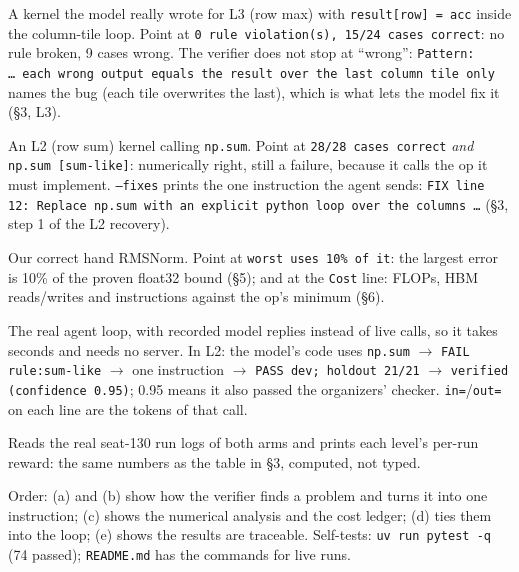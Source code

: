 \documentclass[11pt]{article}
\newcommand{\code}[1]{\texttt{#1}}
\begin{document}
\begin{description}[leftmargin=0pt,itemsep=3pt]
\item[(a) The verifier names the cause.] A kernel the model really wrote for L3 (row max) with
  \code{result[row] = acc} inside the column-tile loop. Point at \code{0 rule violation(s), 15/24 cases
  correct}: no rule broken, 9 cases wrong. The verifier does not stop at ``wrong'': \code{Pattern: \dots\
  each wrong output equals the result over the last column tile only} names the bug (each tile
  overwrites the last), which is what lets the model fix it (\S3, L3).
\item[(b) A violation becomes one instruction.] An L2 (row sum) kernel calling \code{np.sum}. Point at
  \code{28/28 cases correct} \emph{and} \code{np.sum [sum-like]}: numerically right, still a failure,
  because it calls the op it must implement. \code{--fixes} prints the one instruction the agent
  sends: \code{FIX line 12: Replace np.sum with an explicit python loop over the columns \dots}
  (\S3, step 1 of the L2 recovery).
\item[(c) Error bound and cost ledger.] Our correct hand RMSNorm. Point at \code{worst uses 10\% of it}:
  the largest error is 10\% of the proven float32 bound (\S5); and at the \code{Cost} line: FLOPs, HBM
  reads/writes and instructions against the op's minimum (\S6).
\item[(d) The whole loop.] The real agent loop, with recorded model replies instead of live calls, so
  it takes seconds and needs no server. In L2: the model's code uses \code{np.sum} $\to$ \code{FAIL
  rule:sum-like} $\to$ one instruction $\to$ \code{PASS dev; holdout 21/21} $\to$ \code{verified
  (confidence 0.95)}; 0.95 means it also passed the organizers' checker. \code{in=}/\code{out=} on each
  line are the tokens of that call.
\item[(e) The table comes from the logs.] Reads the real seat-130 run logs of both arms and prints each
  level's per-run reward: the same numbers as the table in \S3, computed, not typed.
\end{description}
Order: (a) and (b) show how the verifier finds a problem and turns it into one instruction; (c) shows
the numerical analysis and the cost ledger; (d) ties them into the loop; (e) shows the results are
traceable. Self-tests: \code{uv run pytest -q} (74 passed); \code{README.md} has the commands for live runs.
\end{document}
